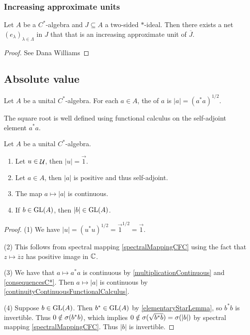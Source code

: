 \subsubsection{Increasing approximate units}
\begin{proposition} \label{approximateUnitInIdeal}
Let $A$ be a $C^*$-algebra and $J \subseteq A$ a two-sided $*$-ideal. Then there exists a net $(e_\lambda)_{\lambda\in\Lambda}$ in $J$ that that is an increasing approximate unit of $\overline{J}$.
\end{proposition}
\begin{proof}
See Dana Williams
\end{proof}

\subsection{Absolute value}
\begin{definition}
Let $A$ be a unital $C^*$-algebra. For each $a\in A$, the  of $a$ is $|a| = (a^*a)^{1/2}$.
\end{definition}
The square root is well defined using functional calculus on the self-adjoint element $a^*a$.

\begin{lemma} \label{propertiesAbsoluteValue}
Let $A$ be a unital $C^*$-algebra.
\begin{enumerate}
\item Let $u\in\mathop{\mathcal{U}}\nolimits$, then $|u| = \vec{1}$.
\item Let $a\in A$, then $|a|$ is positive and thus self-adjoint.
\item The map $a\mapsto |a|$ is continuous.
\item If $b\in \operatorname{GL}(A)$, then $|b|\in \operatorname{GL}(A)$.
\end{enumerate}
\end{lemma}
\begin{proof}
(1) We have $|u| = (u^*u)^{1/2} = \vec{1}^{1/2} = \vec{1}$.

(2) This follows from spectral mapping \ref{spectralMappingCFC} using the fact that $z\mapsto \overline{z}z$ has positive image in $\mathbb{C}$.

(3) We have that $a\mapsto a^*a$ is continuous by \ref{multiplicationContinuous} and \ref{consequencesC*}. Then $a\mapsto |a|$ is continuous by \ref{continuityContinuousFunctionalCalculus}.

(4) Suppose $b\in \operatorname{GL}(A)$. Then $b^*\in \operatorname{GL}(A)$ by \ref{elementaryStarLemma}, so $b^*b$ is invertible. Thus $0\notin \sigma(b^*b)$, which implies $0\notin \sigma(\sqrt{b^*b}) = \sigma(|b|)$ by spectral mapping \ref{spectralMappingCFC}. Thus $|b|$ is invertible.
\end{proof}

